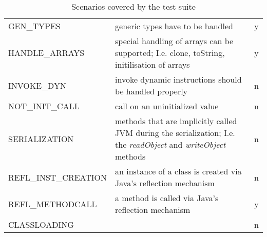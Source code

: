 \begin{table}[htpb]
\begin{tabularx}{\textwidth}{ X X c}
		GEN\_TYPES           & generic types have to be handled                                                                                                                                    & y                 \\
		HANDLE\_ARRAYS       & special handling of arrays can be supported; I.e. clone, toString, initilisation of arrays                                                                          & y                 \\
		INVOKE\_DYN          & invoke dynamic instructions should be handled properly                                                                                                              & n                 \\
		NOT\_INIT\_CALL      & call on an uninitialized value                                                                                                                                      & n                 \\
		SERIALIZATION        & methods that are implicitly called JVM during the serialization; I.e. the \emph{readObject} and \emph{writeObject} methods                                          & n                 \\
		REFL\_INST\_CREATION & an instance of a class is created via Java's reflection mechanism                                                                                                   & n                 \\
		REFL\_METHODCALL     & a method is called via Java's reflection mechanism                                                                                                                  & y                 \\
		CLASSLOADING         &                                                                                                                                                                     & n
	\end{tabularx}
	\centering
	\caption{Scenarios covered by the test suite}
	\label{table:results_casestudy}
\end{table}